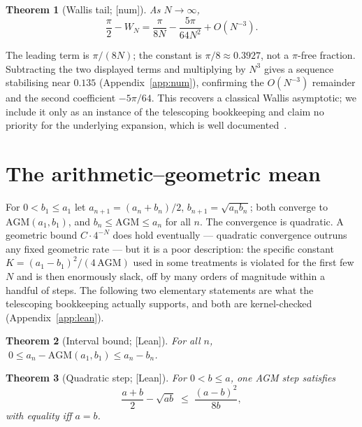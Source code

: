 \documentclass[11pt]{article}
\theoremstyle{plain}
\newtheorem{theorem}{Theorem}
\theoremstyle{remark}
\begin{document}
\begin{theorem}[Wallis tail; \textsf{[num]}]
\label{thm:wallis}
As $N\to\infty$,
\begin{equation}
  \frac{\pi}{2} - W_N = \frac{\pi}{8N} - \frac{5\pi}{64N^{2}} + O(N^{-3}).
  \label{eq:wallis}
\end{equation}
\end{theorem}

The leading term is $\pi/(8N)$; the constant is $\pi/8 \approx 0.3927$, not a
$\pi$-free fraction. Subtracting the two displayed terms and multiplying by
$N^{3}$ gives a sequence stabilising near $0.135$ (Appendix~\ref{app:num}),
confirming the $O(N^{-3})$ remainder and the second coefficient $-5\pi/64$. This
recovers a classical Wallis asymptotic; we include it only as an instance of the
telescoping bookkeeping and claim no priority for the underlying expansion,
which is well documented~\cite{ChenQi,ChenParis,QiMortici}.

\section{The arithmetic--geometric mean}
\label{sec:agm}

For $0 < b_1 \le a_1$ let $a_{n+1} = (a_n+b_n)/2$, $b_{n+1} = \sqrt{a_n b_n}$;
both converge to $\mathrm{AGM}(a_1,b_1)$, and $b_n \le \mathrm{AGM} \le a_n$ for
all $n$. The convergence is quadratic. A geometric bound $C\cdot 4^{-N}$ does
hold eventually --- quadratic convergence outruns any fixed geometric rate ---
but it is a poor description: the specific constant $K = (a_1-b_1)^2/(4\,
\mathrm{AGM})$ used in some treatments is violated for the first few $N$ and is
then enormously slack, off by many orders of magnitude within a handful of
steps. The following two elementary
statements are what the telescoping bookkeeping actually supports, and both are
kernel-checked (Appendix~\ref{app:lean}).

\begin{theorem}[Interval bound; \textsf{[Lean]}]
\label{thm:agm-interval}
For all $n$, $\;0 \le a_n - \mathrm{AGM}(a_1,b_1) \le a_n - b_n$.
\end{theorem}

\begin{theorem}[Quadratic step; \textsf{[Lean]}]
\label{thm:agm-step}
For $0 < b \le a$, one AGM step satisfies
\begin{equation}
  \frac{a+b}{2} - \sqrt{ab} \;\le\; \frac{(a-b)^2}{8b},
\end{equation}
with equality iff $a=b$.
\end{theorem}
\end{document}
